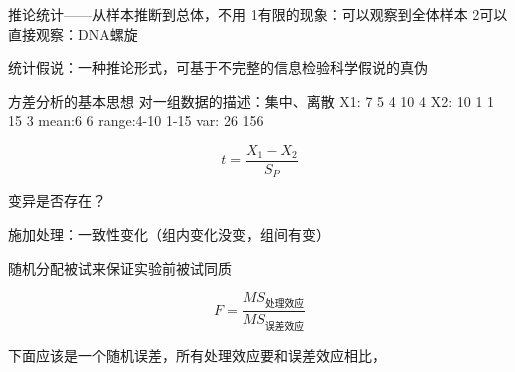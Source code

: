 推论统计——从样本推断到总体，不用
1有限的现象：可以观察到全体样本
2可以直接观察：DNA螺旋

统计假说：一种推论形式，可基于不完整的信息检验科学假说的真伪

方差分析的基本思想
对一组数据的描述：集中、离散
X1: 7 5 4 10 4
X2: 10 1 1 15 3
mean:6 6
range:4-10 1-15
var: 26 156

$$
	t=\frac{X_1-X_2}{S_P}
$$

变异是否存在？

施加处理：一致性变化（组内变化没变，组间有变）

随机分配被试来保证实验前被试同质

$$
	F=\frac{MS_{\text{处理效应}}}{MS_{\text{误差效应}}}
$$

下面应该是一个随机误差，所有处理效应要和误差效应相比，